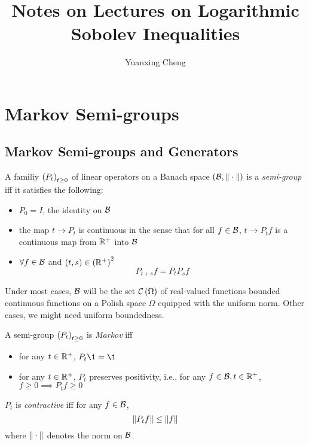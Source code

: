 \documentclass{article}
\title{Notes on Lectures on Logarithmic Sobolev Inequalities}
\author{Yuanxing Cheng}
\begin{document}
\maketitle
\section{Markov Semi-groups}
\subsection{Markov Semi-groups and Generators}

\begin{definition}
    A familiy  \(\left( P_t \right)_{t\geq 0}\) of linear operators on a Banach space  \(\left( \mathcal{B}, \| \cdot \| \right)\) is a \emph{semi-group} iff it satisfies the following:
    \begin{itemize}
        \item \(P_0=I\), the identity on \(\mathcal{B}\)
        \item the map \(t\to P_t\) is continuous in the sense that for all \(f\in \mathcal{B}\), \(t\to P_tf\) is a continuous map from \(\mathbb{R}^+\) into \(\mathcal{B}\)
        \item \(\forall f\in \mathcal{B}\) and \(\left( t,s \right)\in \left( \mathbb{R}^+ \right)^2\) \[P_{t+s} f=P_t P_s f\]
    \end{itemize}

\end{definition}

Under most cases, \(\mathcal{B}\) will be the set \(\mathcal{C}\left( \Omega \right)\) of real-valued functions bounded continuous functions on a Polish space \(\Omega\) equipped with the uniform norm. Other cases, we might need uniform boundedness.

\begin{definition}
    A semi-group \(\left( P_t \right)_{t\geq 0}\) is \emph{Markov} iff
    \begin{itemize}
        \item for any \(t\in\mathbb{R}^+\), \(P_t\1=\1\)
        \item for any \(t\in \mathbb{R}^+\), \(P_t\) preserves positivity, i.e., for any \(f\in\mathcal{B},t\in \mathbb{R}^+\), \(f\geq 0\implies P_tf\geq 0\)
    \end{itemize}
\end{definition}

\begin{definition}
    \(P_t\) is \emph{contractive} iff for any \(f\in\mathcal{B}\), 
    \begin{equation}
        \| P_t f \|\leq \| f \|
    \end{equation}
    where \(\| \cdot \|\) denotes the norm on \(\mathcal{B}\).
\end{definition}
\end{document}

